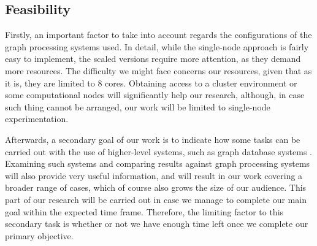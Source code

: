 \documentclass[a4paper,11pt]{article}
\begin{document}
\subsection{Feasibility} \label{feasibility}

\par Firstly, an important factor to take into account regards the configurations of the graph processing systems used. In detail, while the single-node approach is fairly easy to implement, the scaled versions require more attention, as they demand more resources. The difficulty we might face concerns our resources, given that as it is, they are limited to 8 cores. Obtaining access to a cluster environment or some computational nodes will significantly help our research, although, in case such thing cannot be arranged, our work will be limited to single-node experimentation.

\par Afterwards, a secondary goal of our work is to indicate how some tasks can be carried out with the use of higher-level systems, such as graph database systems \cite{emptyheaded, emptyheadedgit, neo4j}.  Examining such systems and comparing results against graph processing systems will also provide very useful information, and will result in our work covering a broader range of cases, which of course also grows the size of our audience. This part of our research will be carried out in case we manage to complete our main goal within the expected time frame. Therefore, the limiting factor to this secondary task is whether or not we have enough time left once we complete our primary objective.



\end{document}

